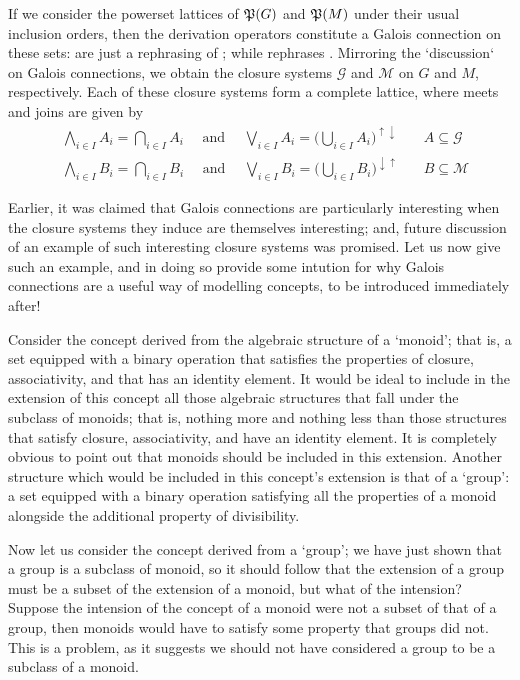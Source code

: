 If we consider the powerset lattices of $\mathfrak{P}({G})$ and $\mathfrak{P}({M})$ under their usual inclusion orders, then the derivation operators constitute a Galois connection on these sets:
 are just a rephrasing of ; while  rephrases
. Mirroring the `discussion` on Galois connections, we obtain the closure systems $\mathcal{G}$ and $\mathcal{M}$ on $G$ and $M$, respectively. Each of these closure
systems form a complete lattice, where meets and joins are given by
%
\begin{align*}
   & \underset{i \in I}\bigwedge A_{i}= \underset{i \in I}\bigcap A_{i}\quad \text{ and }\quad \underset{i \in I}\bigvee A_{i}= \big(\underset{i \in I}\bigcup A_{i}\big)^{\uparrow \downarrow} & \quad A\subseteq \mathcal{G} \\
   & \underset{i \in I}\bigwedge B_{i}= \underset{i \in I}\bigcap B_{i}\quad \text{ and }\quad\underset{i \in I}\bigvee B_{i}= \big( \underset{i \in I}\bigcup B_{i}\big)^{\downarrow \uparrow} & \quad B\subseteq \mathcal{M}
\end{align*}

Earlier, it was claimed that Galois connections are particularly interesting when the closure systems they induce are themselves interesting; and, future discussion of an example of such interesting
closure systems was promised. Let us now give such an example, and in doing so provide some intution for why Galois connections are a useful way of modelling concepts, to be introduced immediately after!

Consider the concept derived from the algebraic structure of a `monoid'; that is, a set equipped with a binary operation that satisfies the properties of closure, associativity, and that has an identity
element. It would be ideal to include in the extension of this concept all those algebraic structures that fall under the subclass of monoids; that is, nothing more and nothing less than those
structures that satisfy closure, associativity, and have an identity element. It is completely obvious to point out that monoids should be included in this extension. Another structure which would be
included in this concept's extension is that of a `group': a set equipped with a binary operation satisfying all the properties of a monoid alongside the additional property of divisibility.

Now let us consider the concept derived from a `group'; we have just shown that a group is a subclass of monoid, so it should follow that the extension of a group must be a subset of the extension of a
monoid, but what of the intension? Suppose the intension of the concept of a monoid were not a subset of that of a group, then monoids would have to satisfy some property that groups did not. This is a
problem, as it suggests we should not have considered a group to be a subclass of a monoid.

